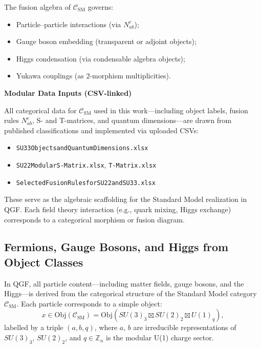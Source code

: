 \documentclass[11pt]{article}
\def\_{}
\begin{document}
\noindent The fusion algebra of \( \mathcal{C}_{\text{SM}} \) governs:
\begin{itemize}
  \item Particle–particle interactions (via \( N_{ab}^c \));
  \item Gauge boson embedding (transparent or adjoint objects);
  \item Higgs condensation (via condensable algebra objects);
  \item Yukawa couplings (as 2-morphism multiplicities).
\end{itemize}

\vspace{0.5em}
\noindent\textbf{Modular Data Inputs (CSV-linked)}

All categorical data for \( \mathcal{C}_{\text{SM}} \) used in this work—including object labels, fusion rules \( N_{ab}^c \), S- and T-matrices, and quantum dimensions—are drawn from published classifications \cite{Rowell2009} and implemented via uploaded CSVs:

\begin{itemize}
  \item \texttt{SU\_3\_\_3\_Objects\_and\_Quantum\_Dimensions.xlsx}
  \item \texttt{SU\_2\_\_2\_Modular\_S-Matrix.xlsx}, \texttt{T-Matrix.xlsx}
  \item \texttt{Selected\_Fusion\_Rules\_for\_SU\_2\_\_2\_and\_SU\_3\_\_3.xlsx}
\end{itemize}

These serve as the algebraic scaffolding for the Standard Model realization in QGF. Each field theory interaction (e.g., quark mixing, Higgs exchange) corresponds to a categorical morphism or fusion diagram.

\subsection{Fermions, Gauge Bosons, and Higgs from Object Classes}

In QGF, all particle content—including matter fields, gauge bosons, and the Higgs—is derived from the categorical structure of the Standard Model category \( \mathcal{C}_{\text{SM}} \). Each particle corresponds to a simple object:
\[
x \in \text{Obj}(\mathcal{C}_{\text{SM}}) = \text{Obj}(SU(3)_3 \boxtimes SU(2)_2 \boxtimes U(1)_q),
\]
labelled by a triple \( (a, b, q) \), where \( a \), \( b \) are irreducible representations of \( SU(3)_3 \), \( SU(2)_2 \), and \( q \in \mathbb{Z}_n \) is the modular U(1) charge sector.
\end{document}
